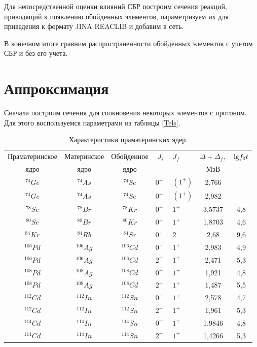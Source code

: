 \documentclass[14pt, a4paper]{article}
\numberwithin{figure}{section}
\numberwithin{equation}{section}
\begin{document}
Для непосредственной оценки влияний СБР построим сечения реакций, приводящий к появлению обойденных элементов, параметризуем их для приведения к формату JINA REACLIB и добавим в сеть.

В конечном итоге сравним распространенности обойденных элементов с учетом СБР и без его учета.

\section{Аппроксимация}

Сначала построим сечения для солкновения некоторых элементов с протоном. Для этого воспользуемся параметрами из таблицы \ref{Tels}. 

\begin{table}
	\centering
	\caption{Характеристики праматеринских ядер.}
	\tabcolsep=5pt
	\begin{tabular}{|c|c|c|HHc|c|}
		\hline
		Праматеринское& Материнское & Обойденное &$\; J_i\; $&$J_f$&$\Delta + \Delta_f,$&${\rm lg} f_0t$\\
		ядро  &   ядро & ядро &&&$\text{МэВ}$&\\
		\hline
		$^{74}Ge$ & $^{74}As$ &$^{74}Se$ & $0^+$  &  $(1^+)$ & 2,766 &      \\
		$^{74}Ge$ & $^{74}As$ &$^{74}Se$& $0^+$  &  $(1^+)$ & 2,982 &      \\
		$^{78}Se$ & $^{78}Br$ &$^{78}Kr$& $0^+$  &  $1^+$  & 3,5737 &   4,8   \\
		$^{80}Se$ & $^{80}Br$ &$^{80}Kr$& $0^+$  &  $1^+$  & 1,8703 &   4,6  \\
		$^{84}Kr$ & $^{84}Rb$ &$^{84}Sr$& $0^+$  &  $2^-$  & 2,68   &   9,6  \\
		$^{106}Pd$ & $^{106}Ag$ &$^{106}Cd$& $0^+$  &  $1^+$  & 2,983 &   4,9   \\
		$^{106}Pd$ & $^{106}Ag$ &$^{106}Cd$& $2^+$  &  $1^+$  & 2,471 &   5,3   \\
		$^{108}Pd$ & $^{108}Ag$ &$^{108}Cd$& $0^+$  &  $1^+$  & 1,921 &   4,8   \\
		$^{108}Pd$ & $^{108}Ag$ &$^{108}Cd$& $2^+$  &  $1^+$  & 1,487 &   5,5   \\
		$^{112}Cd$ & $^{112}In$ &$^{112}Sn$& $0^+$  &  $1^+$  & 2,578 &   4,7   \\
		$^{112}Cd$ & $^{112}In$ &$^{112}Sn$& $2^+$  &  $1^+$  & 1,961 &   5,3   \\
		$^{114}Cd$ & $^{114}In$ &$^{114}Sn$& $0^+$  &  $1^+$  & 1,9846 &   4,8   \\
		$^{114}Cd$ & $^{114}In$&$^{114}Sn$ & $2^+$  &  $1^+$  & 1,4266 &   5,3   \\

\end{tabular}
\end{table}
\end{document}
